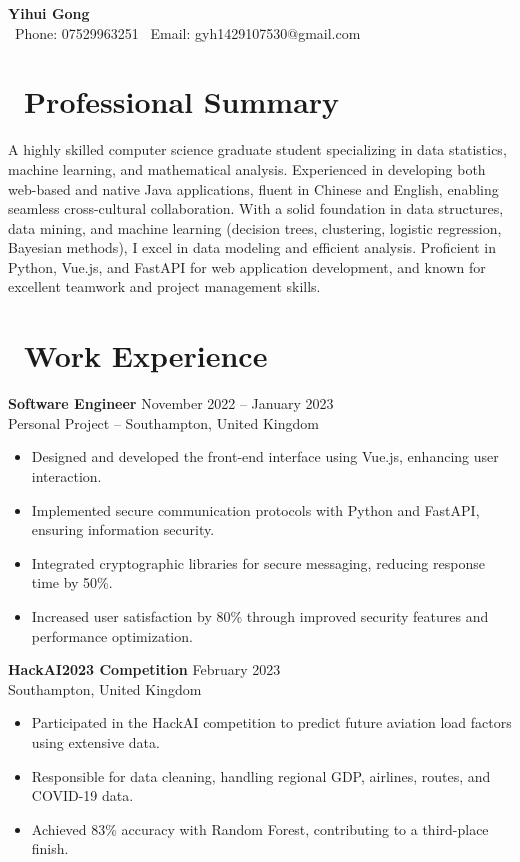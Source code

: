 \documentclass[a4paper,10pt]{article}
\begin{document}
\begin{center}
    {\huge \textbf{Yihui Gong}} \\
    \vspace{0.5em}
    \faPhone\ Phone: 07529963251 \quad
    \faEnvelope\ Email: gyh1429107530@gmail.com
\end{center}

\section*{\faUser\ Professional Summary}
A highly skilled computer science graduate student specializing in data statistics, machine learning, and mathematical analysis. Experienced in developing both web-based and native Java applications, fluent in Chinese and English, enabling seamless cross-cultural collaboration. With a solid foundation in data structures, data mining, and machine learning (decision trees, clustering, logistic regression, Bayesian methods), I excel in data modeling and efficient analysis. Proficient in Python, Vue.js, and FastAPI for web application development, and known for excellent teamwork and project management skills.

\section*{\faBriefcase\ Work Experience}

\textbf{Software Engineer} \hfill November 2022 – January 2023 \\
Personal Project – Southampton, United Kingdom
\begin{itemize}[noitemsep,topsep=0pt]
    \item Designed and developed the front-end interface using Vue.js, enhancing user interaction.
    \item Implemented secure communication protocols with Python and FastAPI, ensuring information security.
    \item Integrated cryptographic libraries for secure messaging, reducing response time by 50\%.
    \item Increased user satisfaction by 80\% through improved security features and performance optimization.
\end{itemize}

\textbf{HackAI2023 Competition} \hfill February 2023 \\
Southampton, United Kingdom
\begin{itemize}[noitemsep,topsep=0pt]
    \item Participated in the HackAI competition to predict future aviation load factors using extensive data.
    \item Responsible for data cleaning, handling regional GDP, airlines, routes, and COVID-19 data.
    \item Achieved 83\% accuracy with Random Forest, contributing to a third-place finish.
\end{itemize}
\end{document}
